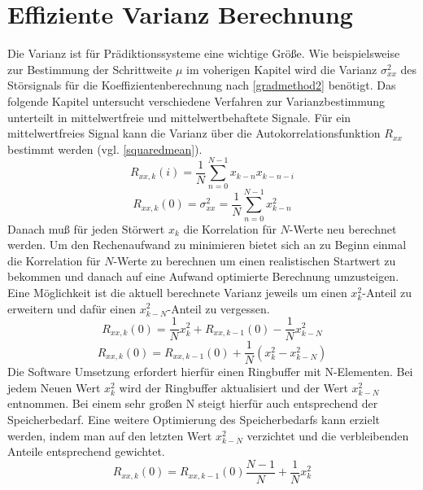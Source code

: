 \documentclass[
    10pt, %
    DIV12,
    english, %
    a5paper, %
    twoside, %
    titlepage, %
    parskip=half, %
    headings=small, %
    listof=totoc, %
    bibliography=totoc, %
    index=totoc, %
    captions=tableheading, %
    final %
]{scrbook}
\begin{document}
\section{Effiziente Varianz Berechnung}
Die Varianz ist für Prädiktionssysteme eine wichtige Größe. Wie beispielsweise zur Bestimmung der Schrittweite $\mu$ im voherigen Kapitel wird die Varianz $\sigma_{xx}^2$ des Störsignals 
für die Koeffizientenberechnung nach \eqref{gradmethod2} benötigt. Das folgende Kapitel untersucht verschiedene Verfahren zur Varianzbestimmung unterteilt in mittelwertfreie und mittelwertbehaftete Signale.\newline
\newline
Für ein mittelwertfreies Signal kann die Varianz über die Autokorrelationsfunktion $R_{xx}$ bestimmt werden (vgl. \eqref{squaredmean}).
\begin{equation}
R_{xx,k}(i)=\frac{1}{N}\sum_{n=0}^{N-1}x_{k-n}x_{k-n-i}\nonumber
\end{equation}
\begin{equation}\label{initsigma}
R_{xx,k}(0)=\sigma_{xx}^2=\frac{1}{N}\sum_{n=0}^{N-1}x_{k-n}^2
\end{equation}
Danach muß für jeden Störwert $x_k$ die Korrelation für $N$-Werte neu berechnet werden. Um den Rechenaufwand zu minimieren bietet sich an zu Beginn einmal die 
Korrelation für $N$-Werte zu berechnen um einen realistischen Startwert zu bekommen und danach auf eine Aufwand optimierte Berechnung umzusteigen. Eine Möglichkeit 
ist die aktuell berechnete Varianz jeweils um einen $x_k^2$-Anteil zu erweitern und dafür einen $x_{k-N}^2$-Anteil zu vergessen.
\begin{equation}
R_{xx,k}(0)=\frac{1}{N}x_k^2+R_{xx,k-1}(0)-\frac{1}{N}x_{k-N}^2\nonumber
\end{equation}
\begin{equation}\label{runsigma1}
R_{xx,k}(0)=R_{xx,k-1}(0)+\frac{1}{N}\left(x_{k}^2-x_{k-N}^2\right)
\end{equation}
Die Software Umsetzung erfordert hierfür einen Ringbuffer mit N-Elementen. Bei jedem Neuen Wert $x_k^2$ wird der Ringbuffer aktualisiert und der Wert $x_{k-N}^2$ entnommen. Bei einem sehr großen N steigt hierfür auch entsprechend der Speicherbedarf. Eine weitere Optimierung des Speicherbedarfs kann erzielt werden, indem man auf den letzten Wert $x_{k-N}^2$ verzichtet und die verbleibenden Anteile entsprechend gewichtet.  
\begin{equation}
R_{xx,k}(0)=R_{xx,k-1}(0)\frac{N-1}{N}+\frac{1}{N}x_{k}^2\nonumber
\end{equation}
\end{document}
